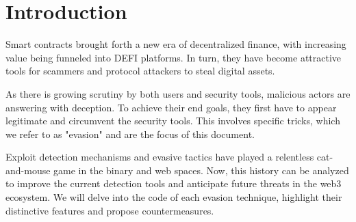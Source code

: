 \section{Introduction} \label{chap:introduction}

Smart contracts brought forth a new era of decentralized finance, with increasing value being funneled into DEFI platforms.
In turn, they have become attractive tools for scammers and protocol attackers to steal digital assets.

As there is growing scrutiny by both users and security tools, malicious actors are answering with deception.
To achieve their end goals, they first have to appear legitimate and circumvent the security tools.
This involves specific tricks, which we refer to as "evasion" and are the focus of this document.

Exploit detection mechanisms and evasive tactics have played a relentless cat-and-mouse game in the binary and web spaces.
Now, this history can be analyzed to improve the current detection tools and anticipate future threats in the web3 ecosystem.
We will delve into the code of each evasion technique, highlight their distinctive features and propose countermeasures.
